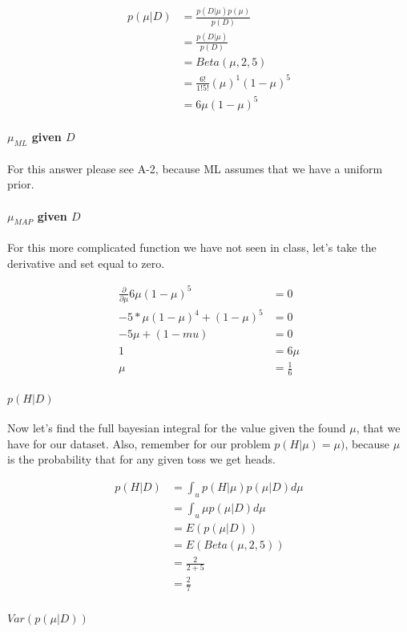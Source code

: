 \documentclass[paper=a4, fontsize=11pt]{scrartcl} %
\begin{document}
\begin{align}
p(\mu|D) &= \frac{p(D|\mu)p(\mu)}{p(D)} \\
&= \frac{p(D|\mu)}{p(D)} \\
&= Beta(\mu,2,5) \\
&= \frac{6!}{1!5!}(\mu)^1(1-\mu)^5 \\
& = 6 \mu(1-\mu)^5
\end{align}

\paragraph{$\mu_{ML}$ given $D$}
For this answer please see A-2, because ML assumes that we have a uniform prior.

\paragraph{$\mu_{MAP}$ given $D$}
For this more complicated function we have not seen in class, let's take the derivative and set equal to zero.

\begin{align}
\frac{\partial}{\partial \mu} 6 \mu(1-\mu)^5 &= 0 \\
 -5*\mu(1-\mu)^4 + (1-\mu)^5 &= 0 \\
-5\mu + (1-mu )&= 0 \\
 1 &= 6\mu \\
\mu &= \frac{1}{6}
\end{align}

\paragraph{$p(H|D)$}
Now let's find the full bayesian integral for the value given the found $\mu$, that we have for our dataset.  Also, remember for our problem $p(H|\mu) = \mu)$, because $\mu$ is the probability that for any given toss we get heads.

\begin{align}
p(H|D) &= \int_u p(H|\mu)p(\mu|D)d\mu \\
&= \int_u \mu p(\mu|D)d\mu \\
&= E( p(\mu|D)) \\
&= E( Beta(\mu,2,5)) \\
&= \frac{2}{2+5} \\
&= \frac{2}{7} \\
\end{align}

\paragraph{$Var(p(\mu|D))$}
\end{document}
